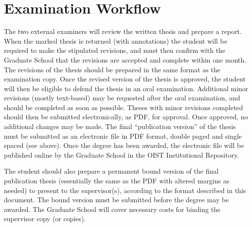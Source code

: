 \section{Examination Workflow}

The two external examiners will review the written thesis and prepare a report.  When the marked thesis is returned (with annotations) the student will be required to make the stipulated revisions, and must then confirm with the Graduate School that the revisions are accepted and complete within one month.  The revisions of the thesis should be prepared in the same format as the examination copy. Once the revised version of the thesis is approved, the student will then be eligible to defend the thesis in an oral examination.  Additional minor revisions (mostly text-based) may be requested after the oral examination, and should be completed as soon as possible.  Theses with minor revisions completed should then be submitted electronically, as PDF, for approval.  Once approved, no additional changes may be made.  The final ``publication version'' of the thesis must be submitted as an electronic file in PDF format, double paged and single spaced (see above).  Once the degree has been awarded, the electronic file will be published online by the Graduate School in the OIST Institutional Repository.

The student should also prepare a permanent bound version of the final publication thesis (essentially the same as the PDF with altered margins as needed) to present to the supervisor(s), according to the format described in this document.  The bound version must be submitted before the degree may be awarded.  The Graduate School will cover necessary costs for binding the supervisor copy (or copies).
